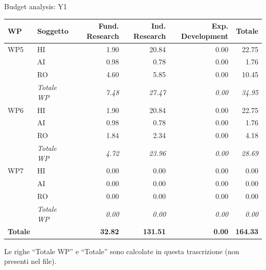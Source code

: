 \documentclass[aspectratio=169,11pt]{beamer}
\begin{document}
\begin{frame}{Budget analysis: Y1}
  
\begin{table}[H]\centering\scriptsize
\begin{tabular}{llrrrr}\toprule\textbf{WP} & \textbf{Soggetto} & \textbf{Fund. Research} & \textbf{Ind. Research} & \textbf{Exp. Development} & \textbf{Totale} \\\midrule
WP5 & HI & 1.90 & 20.84 & 0.00 & 22.75 \\
 & AI & 0.98 & 0.78 & 0.00 & 1.76 \\
 & RO & 4.60 & 5.85 & 0.00 & 10.45 \\
 & \textit{Totale WP} & \textit{7.48} & \textit{27.47} & \textit{0.00} & \textit{34.95} \\\midrule
WP6 & HI & 1.90 & 20.84 & 0.00 & 22.75 \\
 & AI & 0.98 & 0.78 & 0.00 & 1.76 \\
 & RO & 1.84 & 2.34 & 0.00 & 4.18 \\
 & \textit{Totale WP} & \textit{4.72} & \textit{23.96} & \textit{0.00} & \textit{28.69} \\\midrule
WP7 & HI & 0.00 & 0.00 & 0.00 & 0.00 \\
 & AI & 0.00 & 0.00 & 0.00 & 0.00 \\
 & RO & 0.00 & 0.00 & 0.00 & 0.00 \\
 & \textit{Totale WP} & \textit{0.00} & \textit{0.00} & \textit{0.00} & \textit{0.00} \\
\midrule\textbf{Totale} & & \textbf{32.82} & \textbf{131.51} & \textbf{0.00} & \textbf{164.33} \\
\bottomrule\end{tabular}
\par\smallskip\footnotesize Le righe ``Totale WP'' e ``Totale'' sono calcolate in questa trascrizione (non presenti nel file).
\end{table}
\end{frame}
\end{document}
